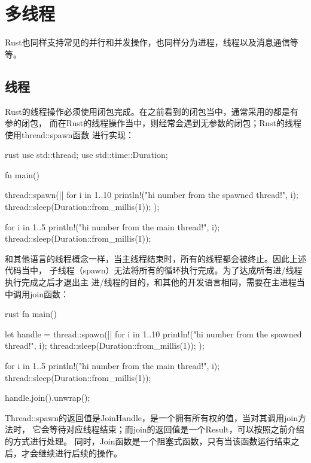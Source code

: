 \section{多线程}
Rust也同样支持常见的并行和并发操作，也同样分为进程，线程以及消息通信等等。

\subsection{线程}
Rust的线程操作必须使用闭包完成。在之前看到的闭包当中，通常采用的都是有参的闭包，
而在Rust的线程操作当中，则经常会遇到无参数的闭包；Rust的线程使用thread::spawn函数
进行实现：
\begin{code-block}{rust}
use std::thread;
use std::time::Duration;

fn main() {
    thread::spawn(|| {
        for i in 1..10 {
            println!("hi number {} from the spawned thread!", i);
            thread::sleep(Duration::from_millis(1));
        }
    });

    for i in 1..5 {
        println!("hi number {} from the main thread!", i);
        thread::sleep(Duration::from_millis(1));
    }

}
\end{code-block}
和其他语言的线程概念一样，当主线程结束时，所有的线程都会被终止。因此上述代码当中，
子线程（spawn）无法将所有的循环执行完成。为了达成所有进/线程执行完成之后才退出主
进/线程的目的，和其他的开发语言相同，需要在主进程当中调用join函数：
\begin{code-block}{rust}
fn main() {

    let handle = thread::spawn(|| {
        for i in 1..10 {
            println!("hi number {} from the spawned thread!", i);
            thread::sleep(Duration::from_millis(1));
        }
    });

    for i in 1..5 {
        println!("hi number {} from the main thread!", i);
        thread::sleep(Duration::from_millis(1));
    }

    handle.join().unwrap();
}
\end{code-block}
Thread::spawn的返回值是JoinHandle，是一个拥有所有权的值，当对其调用join方法时，
它会等待对应线程结束；而join的返回值是一个Result，可以按照之前介绍的方式进行处理。
同时，Join函数是一个阻塞式函数，只有当该函数运行结束之后，才会继续进行后续的操作。

